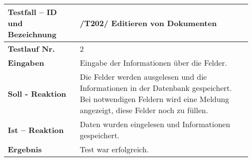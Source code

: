 \begin{longtable}{|p{5cm}|p{10cm}|}
\hline
\textbf{Testfall -- ID und Bezeichnung} & \textnormal{/T202/ Editieren von
Dokumenten} \\
\hline
\textbf{Testlauf Nr.} & \textnormal{2} \\
\hline
\textbf{Eingaben} & \textnormal{
Eingabe der Informationen über die Felder.} \\
\hline
\textbf{Soll - Reaktion} & \textnormal{
Die Felder werden ausgelesen und die Informationen in der Datenbank gespeichert.
Bei notwendigen Feldern wird eine Meldung angezeigt, diese Felder noch zu
füllen.
} \\
\hline
\textbf{Ist -- Reaktion} & \textnormal{Daten wurden eingelesen und Informationen 
gespeichert.} \\
\hline
\textbf{Ergebnis} & \textnormal{Test war erfolgreich.} \\
\hline
\end{longtable}


